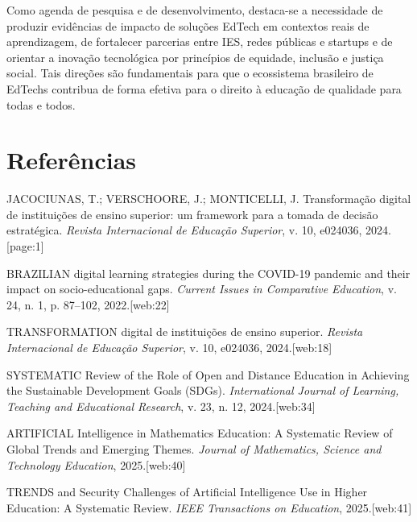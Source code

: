 \documentclass[12pt]{article}
\begin{document}
Como agenda de pesquisa e de desenvolvimento, destaca-se a necessidade de produzir evid\^encias de impacto de solu\c{c}\~oes EdTech em contextos reais de aprendizagem, de fortalecer parcerias entre IES, redes p\'ublicas e startups e de orientar a inova\c{c}\~ao tecnol\'ogica por princ\'ipios de equidade, inclus\~ao e justi\c{c}a social. Tais dire\c{c}\~oes s\~ao fundamentais para que o ecossistema brasileiro de EdTechs contribua de forma efetiva para o direito \`a educa\c{c}\~ao de qualidade para todas e todos.

\section*{Refer\^encias}

JACOCIUNAS, T.; VERSCHOORE, J.; MONTICELLI, J. Transforma\c{c}\~ao digital de institui\c{c}\~oes de ensino superior: um framework para a tomada de decis\~ao estrat\'egica. \textit{Revista Internacional de Educa\c{c}\~ao Superior}, v. 10, e024036, 2024.[page:1]

BRAZILIAN digital learning strategies during the COVID-19 pandemic and their impact on socio-educational gaps. \textit{Current Issues in Comparative Education}, v. 24, n. 1, p. 87--102, 2022.[web:22]

TRANSFORMATION digital de institui\c{c}\~oes de ensino superior. \textit{Revista Internacional de Educa\c{c}\~ao Superior}, v. 10, e024036, 2024.[web:18]

SYSTEMATIC Review of the Role of Open and Distance Education in Achieving the Sustainable Development Goals (SDGs). \textit{International Journal of Learning, Teaching and Educational Research}, v. 23, n. 12, 2024.[web:34]

ARTIFICIAL Intelligence in Mathematics Education: A Systematic Review of Global Trends and Emerging Themes. \textit{Journal of Mathematics, Science and Technology Education}, 2025.[web:40]

TRENDS and Security Challenges of Artificial Intelligence Use in Higher Education: A Systematic Review. \textit{IEEE Transactions on Education}, 2025.[web:41]
\end{document}
